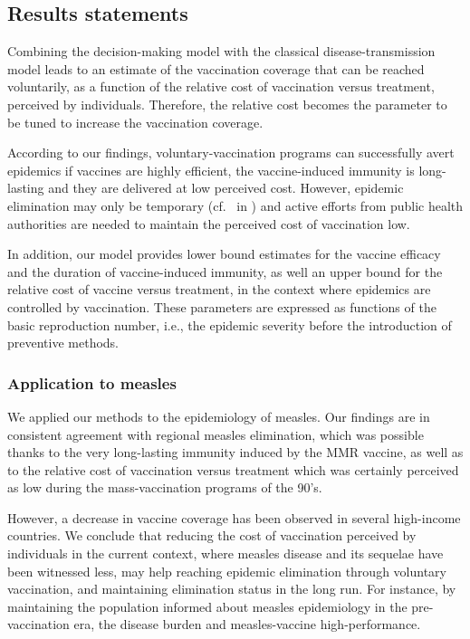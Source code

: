 \subsection{Results statements}
\label{Vaccine:Results}

Combining the decision-making model with the classical disease-transmission model leads to an estimate of the vaccination coverage that can be reached voluntarily, as a function of the relative cost of vaccination versus treatment, perceived by individuals. Therefore, the relative cost becomes the parameter to be tuned to increase the vaccination coverage.

According to our findings, voluntary-vaccination programs can successfully avert epidemics if vaccines are highly efficient, the vaccine-induced immunity is long-lasting and they are delivered at low perceived cost. However, epidemic elimination may only be temporary (cf.~ in ) and active efforts from public health authorities are needed to maintain the perceived cost of vaccination low. 

In addition, our model provides lower bound estimates for the vaccine efficacy and the duration of vaccine-induced immunity, as well an upper bound for the relative cost of vaccine versus treatment, in the context where epidemics are controlled by vaccination. These parameters are expressed as functions of the basic reproduction number, i.e., the epidemic severity before the introduction of preventive methods. 




\subsubsection{Application to measles}
We applied our methods to the epidemiology of measles. Our findings are in consistent agreement with regional measles elimination, which was possible thanks to the very long-lasting immunity induced by the MMR vaccine, as well as to the relative cost of vaccination versus treatment which was certainly perceived as low during the mass-vaccination programs of the 90's. 

However, a decrease in vaccine coverage has been observed in several high-income countries. We conclude that reducing the cost of vaccination perceived by individuals in the current context, where measles disease and its sequelae have been witnessed less, may help reaching epidemic elimination through voluntary vaccination, and maintaining elimination status in the long run. For instance, by maintaining the population informed about measles epidemiology in the pre-vaccination era, the disease burden and measles-vaccine high-performance.

